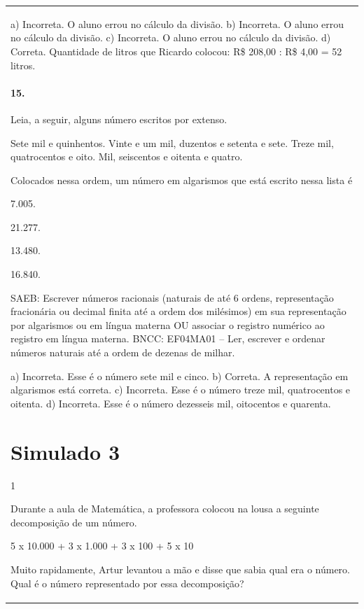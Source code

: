 \begin{mdframed}[linewidth=2pt,linecolor=salmao,roundcorner=2pt]
\begin{escolha}
{{{\begin{longtable}[]{@{}l@{}}
\begin{itemize}
{a) Incorreta. O aluno errou no cálculo da divisão.
b) Incorreta. O aluno errou no cálculo da divisão.
c) Incorreta. O aluno errou no cálculo da divisão.
d) Correta. Quantidade de litros que Ricardo colocou: R\$ 208,00 : R\$ 4,00 = 52
litros.

\subsubsection{15.}

Leia, a seguir, alguns número escritos por extenso.

Sete mil e quinhentos.
Vinte e um mil, duzentos e setenta e sete.
Treze mil, quatrocentos e oito.
Mil, seiscentos e oitenta e quatro.

Colocados nessa ordem, um número em algarismos que está escrito nessa lista é

\begin{escolha}
\item 7.005.
\item 21.277.
\item 13.480.
\item 16.840.
\end{escolha}

SAEB: Escrever números racionais (naturais de até 6 ordens, representação
fracionária ou decimal finita até a ordem dos milésimos) em sua
representação por algarismos ou em língua materna OU associar o registro
numérico ao registro em língua materna.
BNCC: EF04MA01 -- Ler, escrever e ordenar números naturais até a ordem de dezenas de milhar.

a) Incorreta. Esse é o número sete mil e cinco.
b) Correta. A representação em algarismos está correta.
c) Incorreta. Esse é o número treze mil, quatrocentos e oitenta.
d) Incorreta. Esse é o número dezesseis mil, oitocentos e quarenta.

\chapter{Simulado 3}
\markboth{Simulado 3}{}

\num{1}

Durante a aula de Matemática, a professora colocou na lousa a seguinte
decomposição de um número.

5 x 10.000 + 3 x 1.000 + 3 x 100 + 5 x 10

Muito rapidamente, Artur levantou a mão e disse que sabia qual era o
número. Qual é o número representado por essa decomposição?

}
\end{itemize}
\end{longtable}}}}
\end{escolha}
\end{mdframed}
